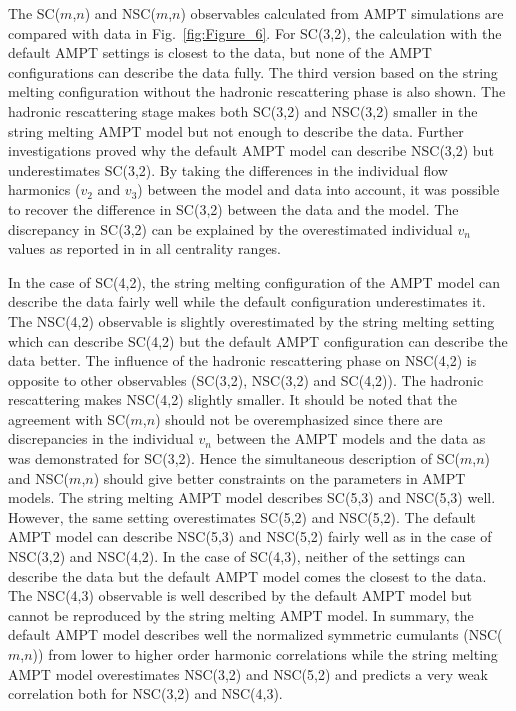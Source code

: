 The SC($m$,$n$) and NSC($m$,$n$) observables calculated from AMPT simulations are compared with data in Fig.~\ref{fig:Figure_6}.
For SC(3,2), the calculation with the default AMPT settings is closest to the data, but none of the AMPT configurations can describe the data fully. 
The third version based on the string melting configuration without the hadronic rescattering phase is also shown.
The hadronic rescattering stage makes both SC(3,2) and NSC(3,2) smaller in the string melting AMPT model but not enough to describe the data.
Further investigations proved why the default AMPT model can describe NSC(3,2) but underestimates SC(3,2). By taking the differences in the individual flow harmonics ($v_2$ and $v_3$) between the model and data into account, it was possible to recover the difference in SC(3,2) between the data and the model. The discrepancy in SC(3,2) can be explained by the overestimated individual $v_n$ values as reported in \cite{Adam:2016nfo} in all centrality ranges. 

In the case of SC(4,2), the string melting configuration of the AMPT model can describe the data fairly well while the default configuration underestimates it.
The NSC(4,2) observable is slightly overestimated by the string melting setting which can describe SC(4,2) but the default AMPT configuration can describe the data better.
The influence of the hadronic rescattering phase on NSC(4,2) is opposite to other observables (SC(3,2), NSC(3,2) and SC(4,2)). The hadronic rescattering makes NSC(4,2) slightly smaller.
It should be noted that the agreement with SC($m$,$n$) should not be overemphasized since there are discrepancies in the individual $v_n$ between the AMPT models and the data as was demonstrated for SC(3,2).
Hence the simultaneous description of SC($m$,$n$) and NSC($m$,$n$) should give better constraints on the parameters in AMPT models.
The string melting AMPT model describes SC(5,3) and NSC(5,3) well. However, the same setting overestimates SC(5,2) and NSC(5,2). 
The default AMPT model can describe NSC(5,3) and NSC(5,2) fairly well as in the case of NSC(3,2) and NSC(4,2).
In the case of SC(4,3), neither of the settings can describe the data but the default AMPT model comes the closest to the data. 
The NSC(4,3) observable is well described by the default AMPT model but cannot be reproduced by the string melting AMPT model.
In summary, the default AMPT model describes well the normalized symmetric cumulants (NSC($m$,$n$)) from lower to higher order harmonic correlations while the string melting AMPT model overestimates NSC(3,2) and NSC(5,2) and predicts a very weak correlation both for NSC(3,2) and NSC(4,3). 

